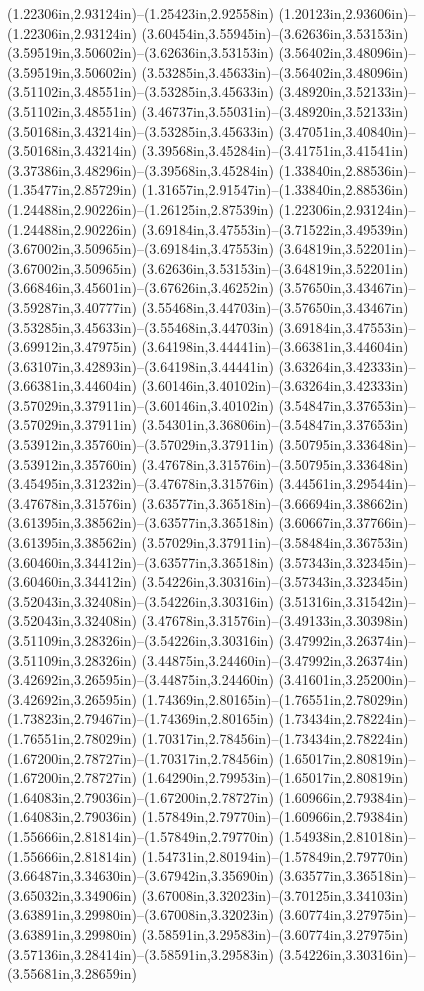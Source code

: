 (1.22306in,2.93124in)--(1.25423in,2.92558in) (1.20123in,2.93606in)--(1.22306in,2.93124in) (3.60454in,3.55945in)--(3.62636in,3.53153in) (3.59519in,3.50602in)--(3.62636in,3.53153in) (3.56402in,3.48096in)--(3.59519in,3.50602in) (3.53285in,3.45633in)--(3.56402in,3.48096in) (3.51102in,3.48551in)--(3.53285in,3.45633in) (3.48920in,3.52133in)--(3.51102in,3.48551in) (3.46737in,3.55031in)--(3.48920in,3.52133in) (3.50168in,3.43214in)--(3.53285in,3.45633in) (3.47051in,3.40840in)--(3.50168in,3.43214in) (3.39568in,3.45284in)--(3.41751in,3.41541in) (3.37386in,3.48296in)--(3.39568in,3.45284in) (1.33840in,2.88536in)--(1.35477in,2.85729in) (1.31657in,2.91547in)--(1.33840in,2.88536in) (1.24488in,2.90226in)--(1.26125in,2.87539in) (1.22306in,2.93124in)--(1.24488in,2.90226in) (3.69184in,3.47553in)--(3.71522in,3.49539in) (3.67002in,3.50965in)--(3.69184in,3.47553in) (3.64819in,3.52201in)--(3.67002in,3.50965in) (3.62636in,3.53153in)--(3.64819in,3.52201in) (3.66846in,3.45601in)--(3.67626in,3.46252in) (3.57650in,3.43467in)--(3.59287in,3.40777in) (3.55468in,3.44703in)--(3.57650in,3.43467in) (3.53285in,3.45633in)--(3.55468in,3.44703in) (3.69184in,3.47553in)--(3.69912in,3.47975in) (3.64198in,3.44441in)--(3.66381in,3.44604in) (3.63107in,3.42893in)--(3.64198in,3.44441in) (3.63264in,3.42333in)--(3.66381in,3.44604in) (3.60146in,3.40102in)--(3.63264in,3.42333in) (3.57029in,3.37911in)--(3.60146in,3.40102in) (3.54847in,3.37653in)--(3.57029in,3.37911in) (3.54301in,3.36806in)--(3.54847in,3.37653in) (3.53912in,3.35760in)--(3.57029in,3.37911in) (3.50795in,3.33648in)--(3.53912in,3.35760in) (3.47678in,3.31576in)--(3.50795in,3.33648in) (3.45495in,3.31232in)--(3.47678in,3.31576in) (3.44561in,3.29544in)--(3.47678in,3.31576in) (3.63577in,3.36518in)--(3.66694in,3.38662in) (3.61395in,3.38562in)--(3.63577in,3.36518in) (3.60667in,3.37766in)--(3.61395in,3.38562in) (3.57029in,3.37911in)--(3.58484in,3.36753in) (3.60460in,3.34412in)--(3.63577in,3.36518in) (3.57343in,3.32345in)--(3.60460in,3.34412in) (3.54226in,3.30316in)--(3.57343in,3.32345in) (3.52043in,3.32408in)--(3.54226in,3.30316in) (3.51316in,3.31542in)--(3.52043in,3.32408in) (3.47678in,3.31576in)--(3.49133in,3.30398in) (3.51109in,3.28326in)--(3.54226in,3.30316in) (3.47992in,3.26374in)--(3.51109in,3.28326in) (3.44875in,3.24460in)--(3.47992in,3.26374in) (3.42692in,3.26595in)--(3.44875in,3.24460in) (3.41601in,3.25200in)--(3.42692in,3.26595in) (1.74369in,2.80165in)--(1.76551in,2.78029in) (1.73823in,2.79467in)--(1.74369in,2.80165in) (1.73434in,2.78224in)--(1.76551in,2.78029in) (1.70317in,2.78456in)--(1.73434in,2.78224in) (1.67200in,2.78727in)--(1.70317in,2.78456in) (1.65017in,2.80819in)--(1.67200in,2.78727in) (1.64290in,2.79953in)--(1.65017in,2.80819in) (1.64083in,2.79036in)--(1.67200in,2.78727in) (1.60966in,2.79384in)--(1.64083in,2.79036in) (1.57849in,2.79770in)--(1.60966in,2.79384in) (1.55666in,2.81814in)--(1.57849in,2.79770in) (1.54938in,2.81018in)--(1.55666in,2.81814in) (1.54731in,2.80194in)--(1.57849in,2.79770in) (3.66487in,3.34630in)--(3.67942in,3.35690in) (3.63577in,3.36518in)--(3.65032in,3.34906in) (3.67008in,3.32023in)--(3.70125in,3.34103in) (3.63891in,3.29980in)--(3.67008in,3.32023in) (3.60774in,3.27975in)--(3.63891in,3.29980in) (3.58591in,3.29583in)--(3.60774in,3.27975in) (3.57136in,3.28414in)--(3.58591in,3.29583in) (3.54226in,3.30316in)--(3.55681in,3.28659in) 